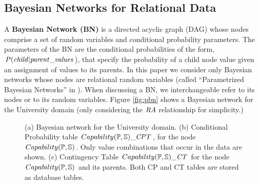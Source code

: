 \documentclass{acm_proc_article-sp}
\begin{document}
\subsection{Bayesian Networks for Relational Data}
A {\bf Bayesian Network (BN)} is a directed acyclic graph (DAG) whose nodes comprise a set of random variables and conditional probability parameters.
The parameters of the BN  are the conditional probabilities of the form, $P(\it{child}|\it{parent\_values}$), that specify the probability of a child node value given an assignment of values to its parents. 
In this paper we consider only Bayesian networks whose nodes are relational random variables (called ``Parametrized Bayesian Networks'' in \cite{Poole2003}). When discussing a BN, we interchangeable refer to its nodes or to its random variables.
Figure \ref{fig:pbn} shows a Bayesian network for the University domain (only considering the $\ra$ relationship for simplicity.) 
\begin{figure}[htbp] %
 \centering
{} 
\caption{(a) Bayesian network for the University domain. (b) Conditional Probability table $Capability(\P,\S)\_\cptable$, for the node $Capability(\P,\S)$. Only value combinations that occur in the data are shown. (c) Contingency Table $Capability(\P,\S)\_\cttable$ for the node $Capability(\P,\S)$ and its parents. Both CP and CT tables are stored as database tables.
}
 \label{fig:pbn}
\label{fig:ct-cp-table}
\end{figure}


\end{document}
